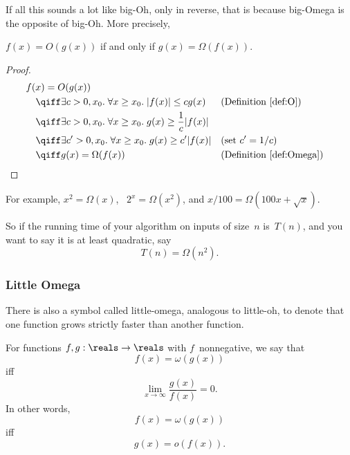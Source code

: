 If all this sounds a lot like big-Oh, only in reverse, that is because
big-Omega is the opposite of big-Oh.  More precisely,

\begin{theorem}\label{thm:9S2}
$f(x) = O(g(x))$ if and only if $g(x) = \Omega(f(x))$.
\end{theorem}

\begin{proof}
\begin{align*}
\lefteqn{f(x) = O(g(x))} \quad&\\
   & \qiff \exists c > 0, x_0. \; \forall x \ge x_0. \;
            |f(x)| \le c g(x) 
        && \text{(Definition~\ref{def:O})} \\
    & \qiff \exists c > 0, x_0. \; \forall x \ge x_0. \;
            g(x) \ge \frac{1}{c} |f(x)| \\
    & \qiff \exists c' > 0, x_0. \; \forall x \ge x_0. \;
            g(x) \ge c' |f(x)|
        && \text{(set $c' = 1/c$)} \\
    & \qiff g(x) = \Omega(f(x))
        && \text{(Definition~\ref{def:Omega})}
\qedhere
\end{align*}
\end{proof}

For example, $x^2 = \Omega(x)$, \ $2^x = \Omega(x^2)$, and $x/100 =
\Omega(100 x + \sqrt{x})$.

So if the running time of your algorithm on inputs of size~$n$
is~$T(n)$, and you want to say it is at least quadratic, say
\begin{equation*}
    T(n) = \Omega(n^2).
\end{equation*}

\subsubsection{Little Omega}

%
There is also a symbol called little-omega, analogous to little-oh, to
denote that one function grows strictly faster than another function.

\begin{definition}\label{def:omega}
For functions $f, g: \reals \to \reals$ with $f$~nonnegative, we say
that
\begin{equation*}
    f(x) = \omega(g(x))
\end{equation*}
iff
\begin{equation*}
    \lim_{x \to \infty} \frac{g(x)}{f(x)} = 0.
\end{equation*}
In other words,
\begin{equation*}
    f(x) = \omega(g(x))
\end{equation*}
iff
\begin{equation*}
    g(x) = o(f(x)).
\end{equation*}
\end{definition}

